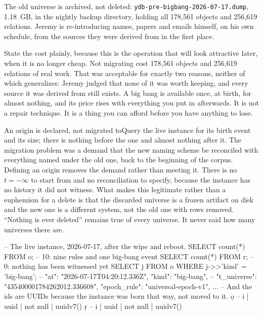The old universe is archived, not deleted: \texttt{ydb-pre-bigbang-2026-07-17.dump}, 1.18~GB, in the nightly backup directory, holding all 178{,}561 objects and 256{,}619 relations. Jeremy is re-introducing names, papers and emails himself, on his own schedule, from the sources they were derived from in the first place.

State the cost plainly, because this is the operation that will look attractive later, when it is no longer cheap. Not migrating cost 178{,}561 objects and 256{,}619 relations of real work. That was acceptable for exactly two reasons, neither of which generalizes: Jeremy judged that none of it was worth keeping, and every source it was derived from still exists. A big bang is available once, at birth, for almost nothing, and its price rises with everything you put in afterwards. It is not a repair technique. It is a thing you can afford before you have anything to lose.

\begin{Correspondence}{An origin is declared, not migrated to}{Query the live instance for its birth event and its size; there is nothing before the one and almost nothing after it.}
The migration problem was a demand that the new naming scheme be reconciled with everything named under the old one, back to the beginning of the corpus. Defining an origin removes the demand rather than meeting it. There is no $t=-\infty$ to start from and no reconciliation to specify, because the instance has no history it did not witness. What makes this legitimate rather than a euphemism for a delete is that the discarded universe is a frozen artifact on disk and the new one is a different system, not the old one with rows removed. ``Nothing is ever deleted'' remains true of every universe. It never said how many universes there are.
\begin{Check}
-- The live instance, 2026-07-17, after the wipe and reboot.
SELECT count(*) FROM o;   -- 10: nine rules and one big-bang event
SELECT count(*) FROM r;   -- 0:  nothing has been witnessed yet
SELECT j FROM o WHERE j->>'kind' = 'big-bang';
--   {"at": "2026-07-17T04:20:12.336Z", "kind": "big-bang",
--    "t_universe": "435400001784262012.336608", "epoch_rule": "universal-epoch-v1", ...}
-- And the ids are UUIDs because the instance was born that way, not moved to it.
\d o   -- i | uuid | not null | uuidv7()
\d r   -- i | uuid | not null | uuidv7()
\end{Check}
\end{Correspondence}

